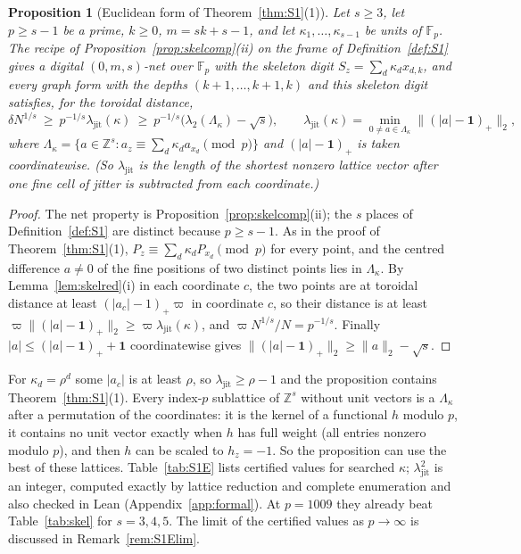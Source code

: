 \documentclass[11pt]{amsart}
\newtheorem{proposition}[theorem]{Proposition}
\theoremstyle{definition}
\theoremstyle{plain}
\newcommand{\Z}{\mathbb{Z}}
\newcommand{\F}{\mathbb{F}}
\begin{document}
\begin{proposition}[Euclidean form of Theorem~\ref{thm:S1}(1)]\label{prop:S1E}
Let $s\ge3$, let $p\ge s-1$ be a prime, $k\ge0$, $m=sk+s-1$, and let $\kappa_1,\dots,\kappa_{s-1}$ be units of $\F_p$. The recipe of Proposition~\ref{prop:skelcomp}(ii) on the frame of Definition~\ref{def:S1} gives a digital $(0,m,s)$-net over $\F_p$ with the skeleton digit $S_z=\sum_d\kappa_dx_{d,k}$, and every graph form with the depths $(k+1,\dots,k+1,k)$ and this skeleton digit satisfies, for the toroidal distance,
\[
\delta N^{1/s}\ \ge\ p^{-1/s}\lambda_{\mathrm{jit}}(\kappa)\ \ge\ p^{-1/s}\bigl(\lambda_2(\Lambda_\kappa)-\sqrt s\bigr),\qquad \lambda_{\mathrm{jit}}(\kappa)=\min_{0\ne a\in\Lambda_\kappa}\bigl\|(|a|-\mathbf 1)_+\bigr\|_2,
\]
where $\Lambda_\kappa=\{a\in\Z^s:a_z\equiv\sum_d\kappa_da_{x_d}\pmod p\}$ and $(|a|-\mathbf 1)_+$ is taken coordinatewise. (So $\lambda_{\mathrm{jit}}$ is the length of the shortest nonzero lattice vector after one fine cell of jitter is subtracted from each coordinate.)
\end{proposition}

\begin{proof}
The net property is Proposition~\ref{prop:skelcomp}(ii); the $s$ places of Definition~\ref{def:S1} are distinct because $p\ge s-1$. As in the proof of Theorem~\ref{thm:S1}(1), $P_z\equiv\sum_d\kappa_dP_{x_d}\pmod p$ for every point, and the centred difference $a\ne0$ of the fine positions of two distinct points lies in $\Lambda_\kappa$. By Lemma~\ref{lem:skelred}(i) in each coordinate $c$, the two points are at toroidal distance at least $(|a_c|-1)_+\varpi$ in coordinate $c$, so their distance is at least $\varpi\|(|a|-\mathbf 1)_+\|_2\ge \varpi\lambda_{\mathrm{jit}}(\kappa)$, and $\varpi N^{1/s}/N=p^{-1/s}$. Finally $|a|\le(|a|-\mathbf 1)_++\mathbf 1$ coordinatewise gives $\|(|a|-\mathbf 1)_+\|_2\ge\|a\|_2-\sqrt s$.
\end{proof}

For $\kappa_d=\rho^d$ some $|a_c|$ is at least $\rho$, so $\lambda_{\mathrm{jit}}\ge\rho-1$ and the proposition contains Theorem~\ref{thm:S1}(1). Every index-$p$ sublattice of $\Z^s$ without unit vectors is a $\Lambda_\kappa$ after a permutation of the coordinates: it is the kernel of a functional $h$ modulo $p$, it contains no unit vector exactly when $h$ has full weight (all entries nonzero modulo $p$), and then $h$ can be scaled to $h_z=-1$. So the proposition can use the best of these lattices. Table~\ref{tab:S1E} lists certified values for searched $\kappa$; $\lambda_{\mathrm{jit}}^2$ is an integer, computed exactly by lattice reduction and complete enumeration and also checked in Lean (Appendix~\ref{app:formal}). At $p=1009$ they already beat Table~\ref{tab:skel} for $s=3,4,5$. The limit of the certified values as $p\to\infty$ is discussed in Remark~\ref{rem:S1Elim}.
\end{document}
